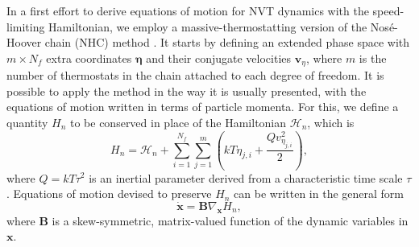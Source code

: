 \documentclass[
aip,
jcp,
reprint,
]{revtex4-1}
\newcommand{\mt}[1]{\boldsymbol{\mathbf{#1}}}          %
\newcommand{\vt}[1]{\boldsymbol{\mathbf{#1}}}          %
\newcommand{\tr}[1]{#1^\text{t}}                       %
\newcommand{\diff}[2]{\frac{\partial #2}{\partial #1}} %
\begin{document}
In a first effort to derive equations of motion for NVT dynamics with the speed-limiting Hamiltonian, we employ a massive-thermostatting version of the Nos\'{e}-Hoover chain (NHC) method \cite{Martyna_1992}.
It starts by defining an extended phase space with $m \times N_f$ extra coordinates $\vt \eta$ and their conjugate velocities $\vt v_\eta$, where $m$ is the number of thermostats in the chain attached to each degree of freedom.
It is possible to apply the method in the way it is usually presented, with the equations of motion written in terms of particle momenta.
For this, we define a quantity $H_n$ to be conserved in place of the Hamiltonian $\mathcal{H}_n$, which is
\begin{equation*}
H_n = {\mathcal H}_n + \sum_{i=1}^{N_f} \sum_{j=1}^m \left(k T \eta_{j, i} + \frac{Q v_{\eta_{j, i}}^2}{2} \right),
\end{equation*}
where $Q = kT \tau^2$ is an inertial parameter derived from a characteristic time scale $\tau$.
Equations of motion devised to preserve $H_n$ can be written in the general form \cite{Sergi_2001}
\begin{equation*}
\dot{\vt x} = {\mt B} \nabla_{\vt x}{H_n},
\end{equation*}
where $\mt B$ is a skew-symmetric, matrix-valued function of the dynamic variables in $\vt x$.
\end{document}
